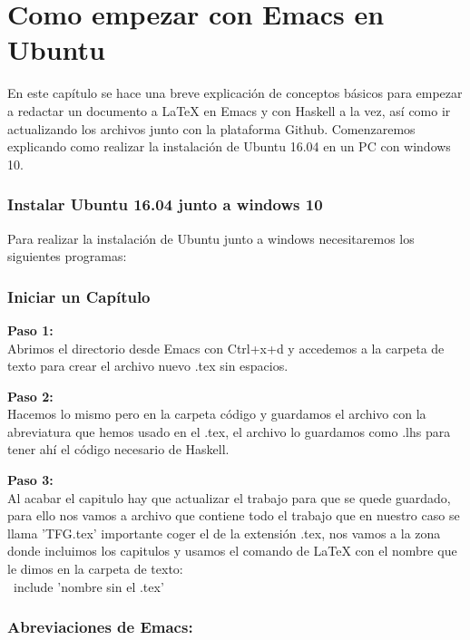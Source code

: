 \chapter{Como empezar con Emacs en Ubuntu}\label{sec:InCapHas}

En este capítulo se hace una breve explicación de conceptos básicos para empezar a redactar un documento a LaTeX en Emacs y con Haskell a la vez, así como ir actualizando los archivos junto con la plataforma Github. Comenzaremos explicando como realizar la instalación de Ubuntu 16.04 en un PC con windows 10.\\

\subsection{Instalar Ubuntu 16.04 junto a windows 10}

Para realizar la instalación de Ubuntu junto a windows necesitaremos los siguientes programas:

 
\subsection{Iniciar un Capítulo}

\textbf{Paso 1:}\\
Abrimos el directorio desde Emacs con Ctrl+x+d y accedemos a la carpeta de texto para crear el archivo nuevo .tex sin espacios.

\textbf{Paso 2:}\\
Hacemos lo mismo pero en la carpeta código y guardamos el archivo con la abreviatura que hemos usado en el .tex, el archivo lo guardamos como .lhs para tener ahí el código necesario de Haskell. 

\textbf{Paso 3:}\\
Al acabar el capitulo hay que actualizar el trabajo para que se quede guardado, para ello nos vamos a archivo que contiene todo el trabajo que en nuestro caso se llama 'TFG.tex' importante coger el de la extensión .tex, nos vamos a la zona donde incluimos los capitulos y usamos el comando de LaTeX con el nombre que le dimos en la carpeta de texto:\\

\ include {'nombre sin el .tex'}



\subsection{Abreviaciones de Emacs:}\\

